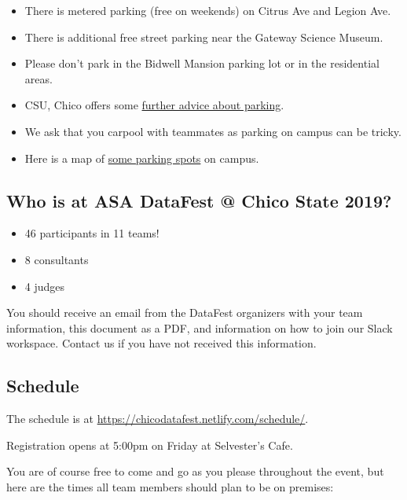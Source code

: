 \documentclass[]{article}
\providecommand{\tightlist}{%
  \setlength{\itemsep}{0pt}\setlength{\parskip}{0pt}}
\begin{document}
\begin{itemize}
\tightlist
\item
  There is metered parking (free on weekends) on Citrus Ave and Legion
  Ave.
\item
  There is additional free street parking near the Gateway Science
  Museum.
\item
  Please don't park in the Bidwell Mansion parking lot or in the
  residential areas.
\item
  CSU, Chico offers some
  \href{https://www.csuchico.edu/parking/wheretopark.shtml}{further
  advice about parking}.
\item
  We ask that you carpool with teammates as parking on campus can be
  tricky.
\item
  Here is a map of
  \href{https://www.csuchico.edu/maps/campus/?id=1193\#!ce/28506,32116,36245?ct/28506,36245,36247,36246,36473,36472,32115,32092?mc/39.72895946407476,-121.8430553376675?z/15?lvl/0}{some
  parking spots} on campus.
\end{itemize}

\hypertarget{who-is-at-asa-datafest-chico-state-2019}{%
\subsection{Who is at ASA DataFest @ Chico State
2019?}\label{who-is-at-asa-datafest-chico-state-2019}}

\begin{itemize}
\tightlist
\item
  46 participants in 11 teams!
\item
  8 consultants
\item
  4 judges
\end{itemize}

You should receive an email from the DataFest organizers with your team
information, this document as a PDF, and information on how to join our
Slack workspace. Contact us if you have not received this information.

\hypertarget{schedule}{%
\subsection{Schedule}\label{schedule}}

The schedule is at \url{https://chicodatafest.netlify.com/schedule/}.

Registration opens at 5:00pm on Friday at Selvester's Cafe.

You are of course free to come and go as you please throughout the
event, but here are the times all team members should plan to be on
premises:
\end{document}
